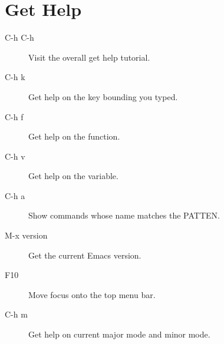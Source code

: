 \chapter{Get Help}

\begin{description}
\item[C-h C-h] Visit the overall get help tutorial.
\item[C-h k] Get help on the key bounding you typed.
\item[C-h f] Get help on the function.
\item[C-h v] Get help on the variable.
\item[C-h a] Show commands whose name matches the PATTEN.
\item[M-x version] Get the current Emacs version.
\item[F10] Move focus onto the top menu bar.
\item[C-h m] Get help on current major mode and minor mode.  
\end{description}